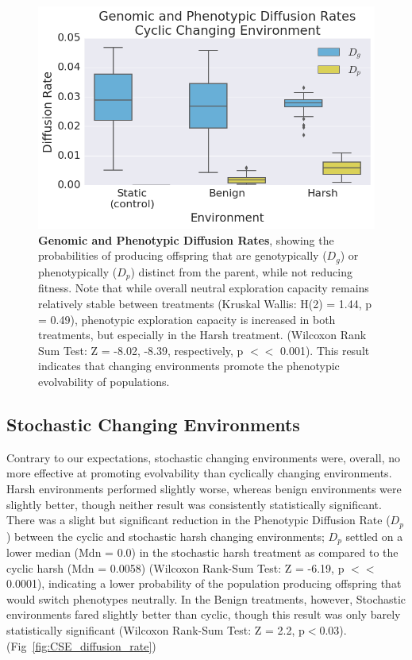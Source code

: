 \documentclass[PhD]{msu-thesis}
\begin{document}
	\begin{figure}[!h] %
	\includegraphics[width=0.75\columnwidth]{figures/CE/CCE_D_g_D_p__box.png}
	\caption{\textbf{Genomic and Phenotypic Diffusion Rates}, showing the probabilities of producing offspring that are genotypically ($D_g$) or phenotypically ($D_p$) distinct from the parent, while not reducing fitness.
	Note that while overall neutral exploration capacity remains relatively stable between treatments (Kruskal Wallis: H(2) = 1.44, p = 0.49), phenotypic exploration capacity is increased in both treatments, but especially in the Harsh treatment. (Wilcoxon Rank Sum Test: Z = -8.02, -8.39, respectively, p $<<$ 0.001). This result indicates that changing environments promote the phenotypic evolvability of populations.
	}\label{fig:CCE_diffusion_rate}
	\end{figure}




\subsection{Stochastic Changing Environments}
Contrary to our expectations, stochastic changing environments were, overall, no more effective at
promoting evolvability than cyclically changing environments. Harsh environments performed slightly worse, whereas benign environments were slightly better, though neither result was consistently statistically significant. There was a slight but significant reduction in the Phenotypic Diffusion Rate ($D_p$) between the cyclic and stochastic harsh changing environments; $D_p$ settled on a lower median (Mdn = 0.0) in the stochastic harsh treatment as compared to the cyclic harsh (Mdn = 0.0058) (Wilcoxon Rank-Sum Test: Z = -6.19, p $<<$ 0.0001), indicating a lower probability of the population producing offspring that would switch phenotypes neutrally. In the Benign treatments, however, Stochastic environments fared slightly better than cyclic, though this result was only barely statistically significant (Wilcoxon Rank-Sum Test: Z = 2.2, p$<$0.03). (Fig~\ref{fig:CSE_diffusion_rate}) 
\end{document}
